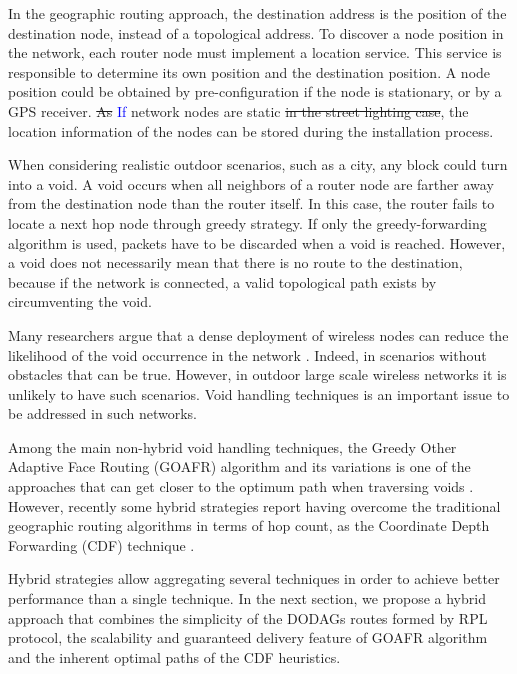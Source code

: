 \documentclass[final,authoryear,3p,twocolumn]{elsarticle}
\newcommand{\rev}{\textcolor{blue}}
\begin{document}
In the geographic routing approach, the destination address is the position of the destination node, instead of a topological address. To discover a node position in the network, each router node must implement a location service. This service is responsible to determine its own position and the destination position. A node position could be obtained by pre-configuration if the node is stationary, or by a GPS receiver. \sout{As} \rev{If} network nodes are static \sout{in the street lighting case}, the location information of the nodes can be stored during the installation process. 

When considering realistic outdoor scenarios, such as a city, any block could turn into a void. A void occurs when all neighbors of a router node are farther away from the destination node than the router itself. In this case, the router fails to locate a next hop node through greedy strategy. If only the greedy-forwarding algorithm is used, packets have to be discarded when a void is reached. However, a void does not necessarily mean that there is no route to the destination, because if the network is connected, a valid topological path exists by circumventing the void. 

Many researchers argue that a dense deployment of wireless nodes can reduce the likelihood of the void occurrence in the network \citep{Position_Based_Routing_Ad_Hoc_2001, WSN_routing, survey_2007}. Indeed, in scenarios without obstacles that can be true. However, in outdoor large scale wireless networks it is unlikely to have such scenarios. Void handling techniques is an important issue to be addressed in such networks. 

Among the main non-hybrid void handling techniques, the Greedy Other Adaptive Face Routing (GOAFR) algorithm and its variations is one of the approaches that can get closer to the optimum path when traversing voids \citep{GOAFR_2008}. However, recently some hybrid strategies report having overcome the traditional geographic routing algorithms in terms of hop count, as the Coordinate Depth Forwarding (CDF) technique \citep{Denardin2011}.

Hybrid strategies allow aggregating several techniques in order to achieve better performance than a single technique. In the next section, we propose a hybrid approach that combines the simplicity of the DODAGs routes formed by RPL protocol, the scalability and guaranteed delivery feature of GOAFR algorithm and the inherent optimal paths of the CDF heuristics.
\end{document}
